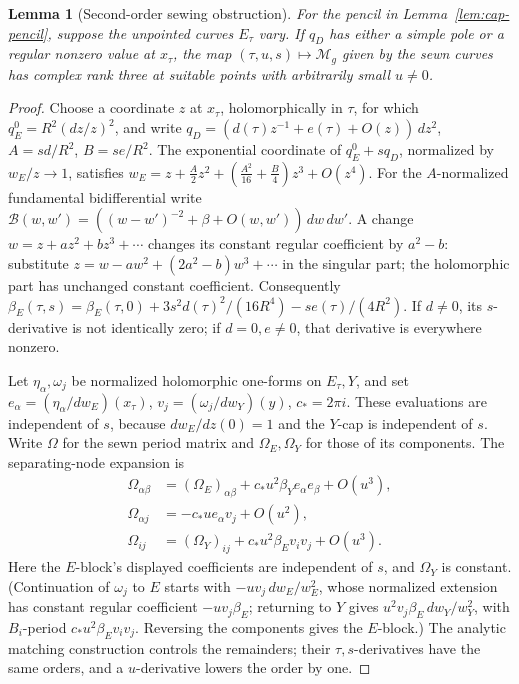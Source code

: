\documentclass[11pt]{article}
\newcommand{\M}{\mathcal M}
\newtheorem{lemma}[theorem]{Lemma}
\theoremstyle{remark}
\begin{document}
\begin{lemma}[Second-order sewing obstruction]\label{lem:sewing}
For the pencil in Lemma~\ref{lem:cap-pencil}, suppose
the unpointed curves \(E_\tau\) vary.
If \(q_D\) has either a simple pole or a regular nonzero
value at \(x_\tau\), the map \((\tau,u,s)\mapsto\M_g\) given by the
sewn curves has complex rank three at suitable points with
arbitrarily small \(u\ne0\).
\end{lemma}
\begin{proof}
Choose a coordinate \(z\) at \(x_\tau\), holomorphically
in \(\tau\), for which \(q_E^0=R^2(dz/z)^2\), and write
\(q_D=(d(\tau)z^{-1}+e(\tau)+O(z))\,dz^2\),
\(A=sd/R^2\), \(B=se/R^2\).
The exponential coordinate of \(q_E^0+s q_D\), normalized
by \(w_E/z\to1\), satisfies
\(w_E=z+\frac A2z^2+(\frac{A^2}{16}+\frac B4)z^3+O(z^4)\).
For the \(A\)-normalized fundamental bidifferential write
\(\mathcal B(w,w')=((w-w')^{-2}+\beta+O(w,w'))\,dw\,dw'\).
A change \(w=z+az^2+bz^3+\cdots\) changes its constant
regular coefficient by \(a^2-b\): substitute
\(z=w-aw^2+(2a^2-b)w^3+\cdots\) in the singular part;
the holomorphic part has unchanged constant coefficient.
Consequently
\(\beta_E(\tau,s)=\beta_E(\tau,0)+3s^2d(\tau)^2/(16R^4)
-se(\tau)/(4R^2)\).
If \(d\ne0\), its \(s\)-derivative is not identically
zero; if \(d=0,e\ne0\), that derivative is everywhere
nonzero.

Let \(\eta_\alpha,\omega_j\) be normalized holomorphic
one-forms on \(E_\tau,Y\), and set
\(e_\alpha=(\eta_\alpha/dw_E)(x_\tau)\),
\(v_j=(\omega_j/dw_Y)(y)\), \(c_*=2\pi i\).
These evaluations are independent of \(s\), because
\(dw_E/dz(0)=1\) and the \(Y\)-cap is independent of \(s\).
Write \(\Omega\) for the sewn period matrix and
\(\Omega_E,\Omega_Y\) for those of its components.
The separating-node expansion is
\begin{align}
 \Omega_{\alpha\beta}
    &=(\Omega_E)_{\alpha\beta}
       +c_*u^2\beta_Y e_\alpha e_\beta+O(u^3),\nonumber\\
 \Omega_{\alpha j}
    &=-c_*u e_\alpha v_j+O(u^2),\label{eq:general-periods}\\
 \Omega_{ij}
    &=(\Omega_Y)_{ij}
       +c_*u^2\beta_E v_i v_j+O(u^3).\nonumber
\end{align}
Here the \(E\)-block's displayed coefficients are independent
of \(s\), and \(\Omega_Y\) is constant.
(Continuation of \(\omega_j\) to \(E\) starts with
\(-uv_j\,dw_E/w_E^2\), whose normalized extension has
constant regular coefficient \(-uv_j\beta_E\); returning to \(Y\)
gives \(u^2v_j\beta_E\,dw_Y/w_Y^2\), with \(B_i\)-period
\(c_*u^2\beta_Ev_iv_j\). Reversing the components gives the
\(E\)-block.) The analytic matching construction
\cite[Theorem 3.3, Section 5.1.1]{HuNorton} controls the
remainders; their \(\tau,s\)-derivatives have the same
orders, and a \(u\)-derivative lowers the order by one.


\end{proof}
\end{document}
